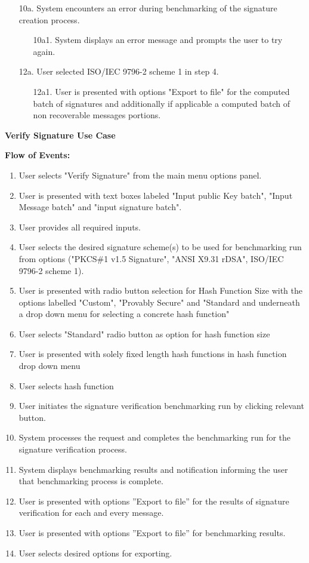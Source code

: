 \documentclass[]{final_report}
\theoremstyle{definition}
\begin{document}
\begin{enumerate}
    \item[10a.] System encounters an error during benchmarking of the signature creation process.
    \begin{enumerate}
        \item[10a1.] System displays an error message and prompts the user to try again.
    \end{enumerate}
    \item[12a.]  User selected ISO\slash IEC 9796-2 scheme 1 in step 4.
    \begin{enumerate}
        \item[12a1.] User is presented with options "Export to file" for the computed batch of signatures and additionally if applicable a computed batch of non recoverable messages portions.
    \end{enumerate}
\end{enumerate}

\textbf{Verify Signature Use Case}

\noindent\textbf{Flow of Events:}
\begin{enumerate}
    \item User selects "Verify Signature" from the main menu options panel.
    \item User is presented with text boxes labeled "Input public Key batch", "Input Message batch" and "input signature batch".
    \item User provides all required inputs.
       \item User selects the desired signature scheme(s) to be used for benchmarking run from options ("PKCS\#1 v1.5 Signature", "ANSI X9.31 rDSA", ISO\slash IEC 9796-2 scheme 1).
      \item User is presented with radio button selection for Hash Function Size with the options labelled "Custom", "Provably Secure" and "Standard and underneath a drop down menu for selecting a concrete hash function"
              \item User selects "Standard" radio button as option for hash function size
         \item User is presented with solely fixed length hash functions in hash function drop down menu
          \item User selects hash function
               \item User initiates the signature verification benchmarking run by clicking relevant button.
         \item System processes the request and completes the benchmarking run for the signature verification process.
      \item System displays benchmarking results and notification informing the user that benchmarking process is complete.
      \item User is presented with options ”Export to file” for the results of signature verification for each and every message.
       \item User is presented with options ”Export to file” for benchmarking results.
       \item User selects desired options for exporting.
\end{enumerate}
\end{document}
